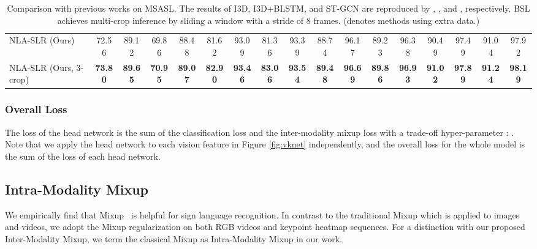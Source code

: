 \documentclass[10pt,twocolumn,letterpaper]{article}
\def \tbf{\textbf}
\begin{document}
\begin{table*}[t]
{\begin{tabular}{l|cc|cc|cc|cc|cc|cc|cc|cc}
NLA-SLR (Ours) & 72.56 & 89.12 & 69.86 & 88.48 & 81.62 & 93.09 & 81.36 & 93.39 & 88.74 & 96.17 & 89.23 & 96.38 & 90.49 & 97.49 & 91.04 & 97.92 \\
NLA-SLR (Ours, 3-crop) & \tbf{73.80} & \tbf{89.65} & \tbf{70.95} & \tbf{89.07} & \tbf{82.90} & \tbf{93.46} & \tbf{83.06} & \tbf{93.54} & \tbf{89.48} & \tbf{96.69} & \tbf{89.86} & \tbf{96.93} & \tbf{91.02} & \tbf{97.89} & \tbf{91.24} & \tbf{98.19} \\
\bottomrule
\end{tabular}}
\vspace{-3mm}
\caption{Comparison with previous works on MSASL. The results of I3D, I3D+BLSTM, and ST-GCN are reproduced by \cite{joze2019ms}, \cite{adaloglou2021comprehensive}, and \cite{hu2021signbert}, respectively. BSL achieves multi-crop inference by sliding a window with a stride of 8 frames. (denotes methods using extra data.)}
\vspace{-5mm}
\label{tab:sota_msasl}
\end{table*}


\vspace{-4mm}
\subsubsection{Overall Loss}
\vspace{-2mm}
\label{sec:overall_loss}
The loss  of the head network is the sum of the classification loss  and the inter-modality mixup loss  with a trade-off hyper-parameter : .
Note that we apply the head network to each vision feature in Figure \ref{fig:vknet} independently, and the overall loss for the whole model is the sum of the loss of each head network.

\subsection{Intra-Modality Mixup}
\label{sec:intra}
We empirically find that Mixup~\cite{zhang2018mixup} is helpful for sign language recognition. In contrast to the traditional Mixup which is applied to images and videos, we adopt the Mixup regularization on both RGB videos and keypoint heatmap sequences. For a distinction with our proposed Inter-Modality Mixup, we term the classical Mixup as Intra-Modality Mixup in our work.
\end{document}
